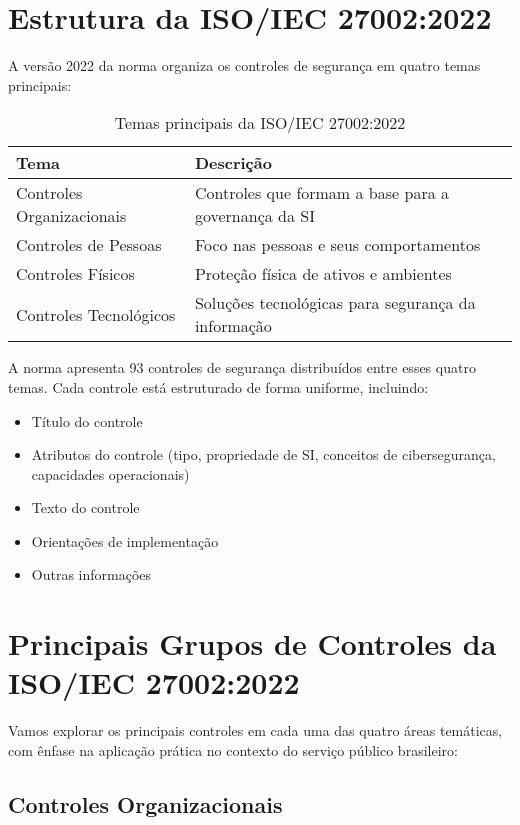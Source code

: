 \documentclass[12pt,a4paper]{report}
\begin{document}
\section{Estrutura da ISO/IEC 27002:2022}

A versão 2022 da norma organiza os controles de segurança em quatro temas principais:

\begin{table}[h]
\centering
\begin{tabular}{ll}
\toprule
\textbf{Tema} & \textbf{Descrição} \\
\midrule
Controles Organizacionais & Controles que formam a base para a governança da SI \\
Controles de Pessoas & Foco nas pessoas e seus comportamentos \\
Controles Físicos & Proteção física de ativos e ambientes \\
Controles Tecnológicos & Soluções tecnológicas para segurança da informação \\
\bottomrule
\end{tabular}
\caption{Temas principais da ISO/IEC 27002:2022}
\end{table}

A norma apresenta 93 controles de segurança distribuídos entre esses quatro temas. Cada controle está estruturado de forma uniforme, incluindo:

\begin{itemize}
  \item Título do controle
  \item Atributos do controle (tipo, propriedade de SI, conceitos de cibersegurança, capacidades operacionais)
  \item Texto do controle
  \item Orientações de implementação
  \item Outras informações
\end{itemize}

\section{Principais Grupos de Controles da ISO/IEC 27002:2022}

Vamos explorar os principais controles em cada uma das quatro áreas temáticas, com ênfase na aplicação prática no contexto do serviço público brasileiro:

\subsection{Controles Organizacionais}
\end{document}
